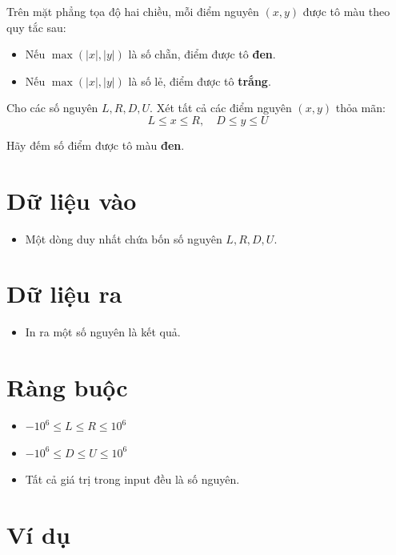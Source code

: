 Trên mặt phẳng tọa độ hai chiều, mỗi điểm nguyên $(x, y)$ được tô màu theo quy tắc sau:
\begin{itemize}
    \item Nếu $\max(|x|, |y|)$ là số chẵn, điểm được tô \textbf{đen}.
    \item Nếu $\max(|x|, |y|)$ là số lẻ, điểm được tô \textbf{trắng}.
\end{itemize}

Cho các số nguyên $L, R, D, U$. Xét tất cả các điểm nguyên $(x, y)$ thỏa mãn:
$$
L \le x \le R,\quad D \le y \le U
$$

Hãy đếm số điểm được tô màu \textbf{đen}.

\section*{Dữ liệu vào}

\begin{itemize}
    \item Một dòng duy nhất chứa bốn số nguyên $L, R, D, U$.
\end{itemize}

\section*{Dữ liệu ra}

\begin{itemize}
    \item In ra một số nguyên là kết quả.
\end{itemize}

\section*{Ràng buộc}

\begin{itemize}
    \item $-10^6 \le L \le R \le 10^6$
    \item $-10^6 \le D \le U \le 10^6$
    \item Tất cả giá trị trong input đều là số nguyên.
\end{itemize}

\section*{Ví dụ}

